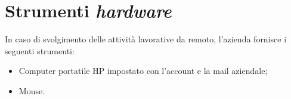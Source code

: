 \section{Strumenti \textit{hardware}}
In caso di svolgimento delle attività lavorative da remoto, l'azienda fornisce i seguenti strumenti:
\begin{itemize}
    \item Computer portatile HP impostato con l'account e la mail aziendale;
    \item Mouse.
\end{itemize}

